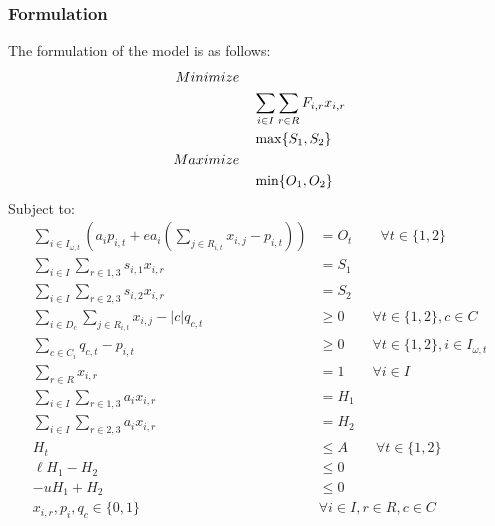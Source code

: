 \subsubsection{Formulation}
The formulation of the model is as follows:
\begin{align}
Minimize \quad & \notag\\
&\sum_{i\in I}\sum_{r\in R} F_{i,r} x_{i,r} \label{eqn:objFire} \\
&\max \{S_1,S_2\} \label{eqn:objSediment} \\
Maximize \quad & \notag\\
&\min \{O_1,O_2\} \label{eqn:objOwl}
\end{align}
Subject to:
\begin{align}
\sum_{i\in I_{\omega,t}} \left(a_i p_{i,t} + e a_i \left( \sum_{j \in R_{i,t}} x_{i,j}-p_{i,t} \right) \right) &= O_t \qquad \forall t \in \{1,2\} \label{eqn:constraintDefOwl}\\
\sum_{i\in I} \sum_{r\in 1,3} s_{i,1} x_{i,r} &= S_1 \label{eqn:constraintSediment1} \\
\sum_{i\in I} \sum_{r\in 2,3} s_{i,2} x_{i,r} &= S_2 \label{eqn:constraintSediment2} \\
\sum_{i \in D_c} \sum_{j \in R_{i,t}} x_{i,j} - |c| q_{c,t} &\ge 0 \qquad \forall t \in \{1,2\}, c \in C \label{eqn:constraintClusterTriggers} \\
\sum_{c \in C_i} q_{c,t} - p_{i,t} &\ge 0 \qquad \forall t \in \{1,2\}, i \in I_{\omega,t} \label{eqn:constraintPVarTriggers} \\
\sum_{r \in R} x_{i,r} &= 1  \qquad \forall i \in I \label{eqn:constraintOnePrescrip} \\
\sum_{i \in I} \sum_{r \in 1,3} a_i x_{i,r} &= H_1 \label{eqn:constraintAreaAcctg1} \\
\sum_{i \in I} \sum_{r \in 2,3} a_i x_{i,r} &= H_2 \label{eqn:constraintAreaAcctg2} \\
H_t &\le A \qquad \forall t \in \{1,2\} \label{eqn:constraintAreaRestr} \\
\ell H_1 - H_2 &\le 0 \label{eqn:constraintAreaFlucL} \\
-u H_1 + H_2 &\le 0 \label{eqn:constraintAreaFlucU} \\
x_{i,r}, p_i, q_c \in \{0,1\} \quad &\forall i \in I, r \in R, c \in C \label{eqn:constraintNonNeg}
\end{align}

